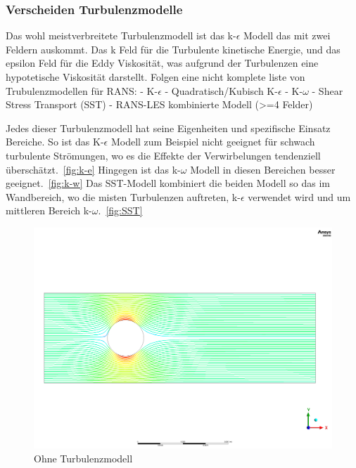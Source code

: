 \begin{refsection}
\subsubsection{Verscheiden Turbulenzmodelle}

Das wohl meistverbreitete Turbulenzmodell ist das k-$\epsilon$ Modell das mit zwei Feldern auskommt. Das k Feld für die Turbulente kinetische Energie, und das epsilon Feld für die Eddy Viskosität, was aufgrund der Turbulenzen eine hypotetische Viskosität darstellt.
Folgen eine nicht komplete liste von Trubulenzmodellen für RANS:
-	K-$\epsilon$
-	Quadratisch/Kubisch K-$\epsilon$
-	K-$\omega$
-	Shear Stress Transport (SST)
-	RANS-LES kombinierte Modell (>=4 Felder)

Jedes dieser Turbulenzmodell hat seine Eigenheiten und spezifische Einsatz Bereiche.
So ist das K-$\epsilon$ Modell zum Beispiel nicht geeignet für schwach turbulente Strömungen,
wo es die Effekte der Verwirbelungen tendenziell überschätzt.~\ref{fig:k-e}
Hingegen ist das k-$\omega$ Modell in diesen Bereichen besser geeignet.~\ref{fig:k-w}
Das SST-Modell kombiniert die beiden Modell so das im Wandbereich,
wo die misten Turbulenzen auftreten, k-$\epsilon$ verwendet wird und um mittleren Bereich k-$\omega$.~\ref{fig:SST}

\begin{figure}
    \includegraphics[width=\textwidth]{papers/reynolds/images/dns.png}
    \caption{Ohne Turbulenzmodell}
    \label{fig:DNS}
\end{figure}


\end{refsection}
